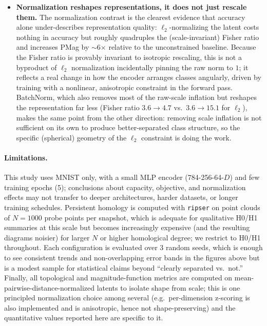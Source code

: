 \documentclass[11pt]{article}
\begin{document}
\begin{itemize}
  \item \textbf{Normalization reshapes representations, it does not just
  rescale them.} The normalization contrast is the clearest evidence that
  accuracy alone under-describes representation quality:
  $\ell_2$-normalizing the latent costs nothing in accuracy but roughly
  quadruples the (scale-invariant) Fisher ratio and increases PMag by
  $\sim$6$\times$ relative to the unconstrained baseline. Because the Fisher
  ratio is provably invariant to isotropic rescaling, this is not a
  byproduct of $\ell_2$ normalization incidentally pinning the raw norm to
  $1$; it reflects a real change in how the encoder arranges classes
  angularly, driven by training with a nonlinear, anisotropic constraint in
  the forward pass. BatchNorm, which also removes most of the raw-scale
  inflation but reshapes the representation far less (Fisher ratio
  $3.6\to4.7$ vs.\ $3.6\to15.1$ for $\ell_2$), makes the same point from the
  other direction: removing scale inflation is not sufficient on its own to
  produce better-separated class structure, so the specific (spherical)
  geometry of the $\ell_2$ constraint is doing the work.
\end{itemize}

\paragraph{Limitations.} This study uses MNIST only, with a small MLP
encoder (784-256-64-$D$) and few training epochs (5); conclusions about
capacity, objective, and normalization effects may not transfer to deeper
architectures, harder datasets, or longer training schedules. Persistent
homology is computed with \texttt{ripser} on point clouds of $N{=}1000$
probe points per snapshot, which is adequate for qualitative H0/H1 summaries
at this scale but becomes increasingly expensive (and the resulting diagrams
noisier) for larger $N$ or higher homological degree; we restrict to H0/H1
throughout. Each configuration is evaluated over 3 random seeds, which is
enough to see consistent trends and non-overlapping error bands in the
figures above but is a modest sample for statistical claims beyond ``clearly
separated vs.\ not.'' Finally, all topological and magnitude-function
metrics are computed on mean-pairwise-distance-normalized latents to isolate
shape from scale; this is one principled normalization choice among several
(e.g.\ per-dimension z-scoring is also implemented and is anisotropic, hence
not shape-preserving) and the quantitative values reported here are specific
to it.
\end{document}
